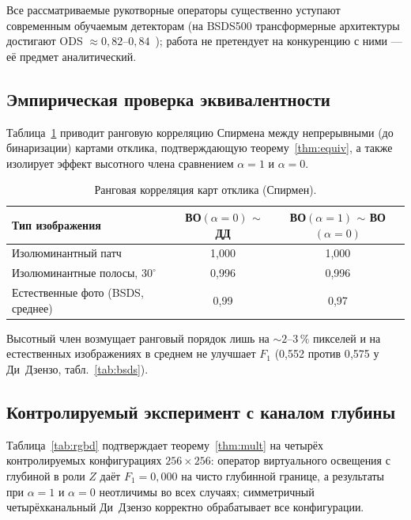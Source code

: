 \documentclass[11pt,a4paper]{article}
\theoremstyle{plain}
\theoremstyle{definition}
\theoremstyle{remark}
\begin{document}
Все рассматриваемые рукотворные операторы существенно уступают современным
обучаемым детекторам (на BSDS500 трансформерные архитектуры достигают
ODS ${\approx}0{,}82$--$0{,}84$~\cite{pu2022edter}); работа не претендует
на конкуренцию с ними --- её предмет аналитический.

\subsection{Эмпирическая проверка эквивалентности}

Таблица~\ref{tab:corr} приводит ранговую корреляцию Спирмена между
непрерывными (до бинаризации) картами отклика, подтверждающую
теорему~\ref{thm:equiv}, а также изолирует эффект высотного члена
сравнением $\alpha = 1$ и $\alpha = 0$.

\begin{table}[h]
\centering
\caption{Ранговая корреляция карт отклика (Спирмен).}
\label{tab:corr}
\begin{tabular}{lcc}
\toprule
Тип изображения & ВО$(\alpha{=}0)$ $\sim$ ДД & ВО$(\alpha{=}1)$ $\sim$ ВО$(\alpha{=}0)$ \\
\midrule
Изолюминантный патч                 & 1{,}000 & 1{,}000 \\
Изолюминантные полосы, $30^\circ$   & 0{,}996 & 0{,}996 \\
Естественные фото (BSDS, среднее)   & 0{,}99  & 0{,}97  \\
\bottomrule
\end{tabular}
\end{table}

Высотный член возмущает ранговый порядок лишь на ${\sim}2$--$3\,\%$
пикселей и на естественных изображениях в среднем не улучшает $F_1$
(0{,}552 против 0{,}575 у Ди~Дзензо, табл.~\ref{tab:bsds}).

\subsection{Контролируемый эксперимент с каналом глубины}

Таблица~\ref{tab:rgbd} подтверждает теорему~\ref{thm:mult} на четырёх
контролируемых конфигурациях $256\times256$: оператор виртуального освещения
с глубиной в роли $Z$ даёт $F_1 = 0{,}000$ на чисто глубинной границе, а
результаты при $\alpha = 1$ и $\alpha = 0$ неотличимы во всех случаях;
симметричный четырёхканальный Ди~Дзензо корректно обрабатывает все
конфигурации.
\end{document}
